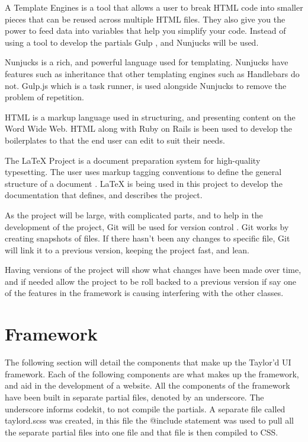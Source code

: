 A Template Engines is a tool that allows a user to break HTML code into smaller pieces that can be reused across multiple HTML files. They also give you the power to feed data into variables that help you simplify your code. Instead of using a tool to develop the partials Gulp \citep{GULP17}, and Nunjucks \citep{NUN17}  will be used.

Nunjucks is a rich, and powerful language used for templating. Nunjucks have features such as inheritance that other templating engines such as Handlebars do not. Gulp.js which is a task runner, is used alongside Nunjucks to remove the problem of repetition. 

HTML is a markup language used in structuring, and presenting content on the Word Wide Web. HTML along with Ruby on Rails is been used to develop the boilerplates to that the end user can edit to suit their needs. 

The LaTeX Project is a document preparation system for high-quality typesetting. The user uses markup tagging conventions to define the general structure of a document \citep{LAT17}. LaTeX is being used in this project to develop the documentation that defines, and describes the project.

As the project will be large, with complicated parts, and to help in the development of the project, Git will be used for version control \citep{GIT05}. Git works by creating snapshots of files. If there hasn't been any changes to specific file, Git will link it to a previous version, keeping the project fast, and lean. 

Having versions of the project will show what changes have been made over time, and if needed allow the project to be roll backed to a previous version if say one of the features in the framework is causing interfering with the other classes.

\newpage
\section*{Framework}
The following section will detail the components that make up the Taylor'd UI framework. Each of the following components are what makes up the framework, and aid in the development of a website. All the components of the framework have been built in separate partial files, denoted by an underscore. The underscore informs codekit, to not compile the partials. A separate file called taylord.scss was created, in this file the @include statement was used to pull all the separate partial files into one file and that file is then compiled to \gls{CSS}. 


